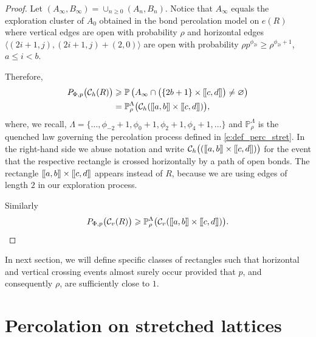 \documentclass[a4paper,oneside,12pt]{amsart}
\def\llbracket{[\hspace{-.10em} [ }
\def\rrbracket{ ] \hspace{-.10em}]}
\renewcommand{\leq}{\leqslant}
\renewcommand{\geq}{\geqslant}
\theoremstyle{plain}
\theoremstyle{definition}
\theoremstyle{remark}
\renewcommand{\P}{\mathbb{P}}
\begin{document}
\begin{proof}
Let $(A_{\infty}, B_{\infty}) = \cup_{n\geq 0}(A_n, B_n)$.
Notice that $A_\infty$ equals the exploration cluster of $A_0$ obtained in the bond percolation model on $e(R)$ where vertical edges are open with probability $\rho$ and horizontal edges $\langle (2i+1,j),(2i+1,j)+(2,0) \rangle$ are open with probability $\rho p^{\phi_{2i}} \geq \rho^{\phi_{2i} + 1}$, $a \leq i < b$.

Therefore,
\begin{align*}
P_{\Phi,p}\big(\mathcal{C}_{h}(R)\big) & 
\geq 
\P\left( A_{\infty}\cap \big(  \{2b+1\} \times \llbracket c,d \rrbracket \big) \neq \varnothing \right) \\ 
& = \P_{\rho}^{\Lambda}\big(\mathcal{C}_{h}(\llbracket a,b \rrbracket \times\llbracket c,d \rrbracket)\big),
\end{align*}
where, we recall, $\Lambda = \{\ldots, \phi_{-2}+1, \phi_0+1, \phi_2+1, \phi_4+1, \ldots \}$ and $\mathbb{P}^{\Lambda}_{\rho}$ is the quenched law governing the percolation process defined in \eqref{e:def_perc_stret}.
In the right-hand side we abuse notation and write $\mathcal{C}_h \big( (\llbracket a,b \rrbracket \times\llbracket c,d \rrbracket) \big)$ for the event that the respective rectangle is crossed horizontally by a path of  open bonds.
The rectangle $\llbracket a,b \rrbracket \times\llbracket c,d \rrbracket$ appears instead of $R$, because we are using edges of length $2$ in our exploration process.

Similarly
\begin{equation*}
P_{\Phi,p}\big(\mathcal{C}_{v}(R)\big) \geq \P_{\rho}^{\Lambda}\big(\mathcal{C}_{v}(\llbracket a,b \rrbracket \times\llbracket c,d \rrbracket)\big).
\end{equation*}
\end{proof}

In next section, we will define specific classes of rectangles such that horizontal and vertical crossing events almost surely occur provided that $p$, and consequently $\rho$, are sufficiently close to $1$. 


\section{Percolation on stretched lattices}
\label{sec:stretched}
\end{document}
